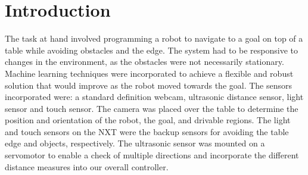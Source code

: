 \section{Introduction}
\label{section::introduction}

The task at hand involved programming a robot to navigate to a goal on top of a table while avoiding obstacles and the edge. The system had to be responsive to changes in the environment, as the obstacles were not necessarily stationary. Machine learning techniques were incorporated to achieve a flexible and robust solution that would improve as the robot moved towards the goal. The sensors incorporated were: a standard definition webcam, ultrasonic distance sensor, light sensor and touch sensor. The camera was placed over the table to determine the position and orientation of the robot, the goal, and drivable regions. The light and touch sensors on the NXT were the backup sensors for avoiding the table edge and objects, respectively. The ultrasonic sensor was mounted on a servomotor to enable a check of multiple directions and incorporate the different distance measures into our overall controller.
